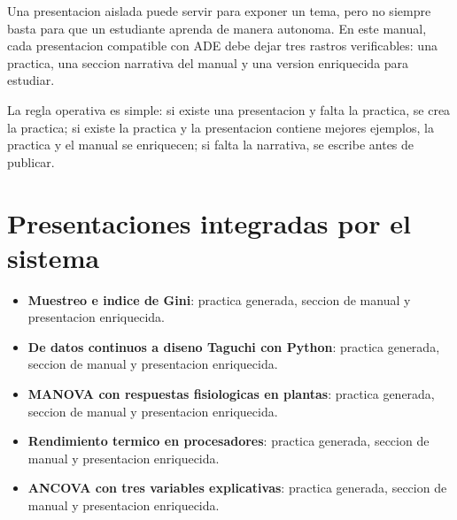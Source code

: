
        Una presentacion aislada puede servir para exponer un tema, pero no siempre basta para que un estudiante aprenda de manera autonoma. En este manual, cada presentacion compatible con ADE debe dejar tres rastros verificables: una practica, una seccion narrativa del manual y una version enriquecida para estudiar.

        \begin{idea}
        La regla operativa es simple: si existe una presentacion y falta la practica, se crea la practica; si existe la practica y la presentacion contiene mejores ejemplos, la practica y el manual se enriquecen; si falta la narrativa, se escribe antes de publicar.
        \end{idea}

        \section{Presentaciones integradas por el sistema}

        \begin{itemize}
        \item \textbf{Muestreo e indice de Gini}: practica generada, seccion de manual y presentacion enriquecida.
\item \textbf{De datos continuos a diseno Taguchi con Python}: practica generada, seccion de manual y presentacion enriquecida.
\item \textbf{MANOVA con respuestas fisiologicas en plantas}: practica generada, seccion de manual y presentacion enriquecida.
\item \textbf{Rendimiento termico en procesadores}: practica generada, seccion de manual y presentacion enriquecida.
\item \textbf{ANCOVA con tres variables explicativas}: practica generada, seccion de manual y presentacion enriquecida.
        \end{itemize}

        




